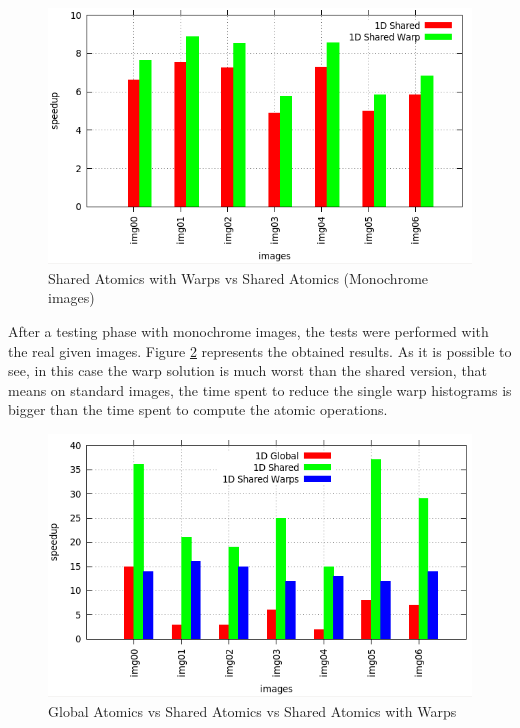 \documentclass[a4paper]{article}
\begin{document}
\begin{figure}[!ht]
    \centering
    \includegraphics[width=0.7\linewidth]{res/new/histogram_warp}
    \caption{Shared Atomics with Warps vs Shared Atomics (Monochrome images)}
    \label{fig:sawvsa}
\end{figure}
\FloatBarrier

After a testing phase with monochrome images, the tests were performed with the real given images. Figure \ref{fig:gasawvsa} represents the obtained results. As it is possible to see, in this case the warp solution is much worst than the shared version, that means on standard images, the time spent to reduce the single warp histograms is bigger than the time spent to compute the atomic operations. 

\begin{figure}[!ht]
    \centering
    \includegraphics[width=0.7\linewidth]{res/new/histogram_confronto_real}
    \caption{Global Atomics vs Shared Atomics vs Shared Atomics with Warps}
    \label{fig:gasawvsa}
\end{figure}
\FloatBarrier
\end{document}
